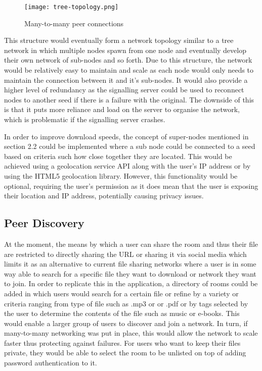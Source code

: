 \documentclass[]{report}
\begin{document}
			\begin{figure}[H]
				\caption{Many-to-many peer connections}
				\centering
				\texttt{[image: tree-topology.png]}
			\end{figure}	
			
			This structure would eventually form a network topology similar to a tree network in which multiple nodes spawn from one node and eventually develop their own network of sub-nodes and so forth. Due to this structure, the network would be relatively easy to maintain and scale as each node would only needs to maintain the connection between it and it's sub-nodes. It would also provide a higher level of redundancy as the signalling server could be used to reconnect nodes to another seed if there is a failure with the original. The downside of this is that it puts more reliance and load on the server to organise the network, which is problematic if the signalling server crashes.
			
			In order to improve download speeds, the concept of super-nodes mentioned in section 2.2 could be implemented where a sub node could be connected to a seed based on criteria such how close together they are located. This would be achieved using a geolocation service API along with the user's IP address or by using the HTML5 geolocation library. However, this functionality would be optional, requiring the user's permission as it does mean that the user is exposing their location and IP address, potentially causing privacy issues.
			
			\subsection{Peer Discovery}
			At the moment, the means by which a user can share the room and thus their file are restricted to directly sharing the URL or sharing it via social media which limits it as an alternative to current file sharing networks where a user is in some way able to search for a specific file they want to download or network they want to join. In order to replicate this in the application, a directory of rooms could be added in which users would search  for a certain file or refine by a variety or criteria ranging from type of file such as .mp3 or or .pdf or by tags selected by the user to determine the contents of the file such as music or e-books. This would enable a larger group of users to discover and join a network. In turn, if many-to-many networking was put in place, this would allow the network to scale faster thus protecting against failures. For users who want to keep their files private, they would be able to select the room to be unlisted on top of adding password authentication to it.
			
\end{document}
